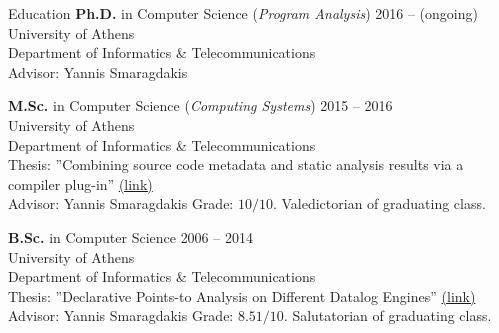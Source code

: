 \documentclass{resume}
\begin{document}
\newcommand{\mytilde}{\raise.17ex\hbox{$\scriptstyle\mathtt{\sim}$}}
\newcommand{\indentitem}{\setlength\itemindent{25pt}}


\begin{rSection}{Education}
{\bf Ph.D.} in Computer Science (\textit{Program Analysis}) \hfill {2016 -- (ongoing) } \\
University of Athens \\
Department of Informatics \& Telecommunications \\
Advisor: Yannis Smaragdakis

{\bf M.Sc.} in Computer Science (\textit{Computing Systems}) \hfill {2015 -- 2016 } \\
University of Athens \\
Department of Informatics \& Telecommunications \\
Thesis: ''Combining source code metadata and static analysis results via a compiler plug-in'' \href{http://cgi.di.uoa.gr/~smaragd/theses/antoniadis2.pdf}{ (link)} \\
Advisor: Yannis Smaragdakis
Grade: $10 / 10$. Valedictorian of graduating class.

{\bf B.Sc.} in Computer Science \hfill {2006 -- 2014}  \\
University of Athens \\
Department of Informatics \& Telecommunications \\
Thesis: ''Declarative Points-to Analysis on Different Datalog Engines'' \href{http://cgi.di.uoa.gr/~smaragd/theses/antoniadis.pdf}{ (link)} \\
Advisor: Yannis Smaragdakis
Grade: $8.51 / 10$. Salutatorian of graduating class.

\end{rSection}

\end{document}
